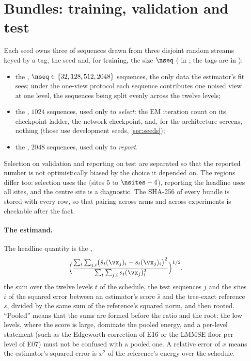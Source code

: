 \section{Bundles: training, validation and test}
\label{sec:bundles}

Each seed owns three  of sequences drawn from three disjoint random
streams keyed by a tag, the seed and, for training, the size $\nseq$
( in ; the tags are in
):
\begin{itemize}
\item the , $\nseq\in\{32,128,512,2048\}$ sequences, the only
  data the estimator's fit sees; under the one-view protocol each sequence
  contributes one noised view at one level, the sequences being split evenly across
  the twelve levels;
\item the , $1024$ sequences, used only to \emph{select}: the
  EM iteration count on its checkpoint ladder, the network checkpoint, and, for the
  architecture screens, nothing (those use development seeds, \cref{sec:seeds});
\item the , $2048$ sequences, used only to \emph{report}.
\end{itemize}
Selection on validation and reporting on test are separated so that the reported
number is not optimistically biased by the choice it depended on. The regions differ
too: selection uses the  (sites $5$ to $\nsites-4$), reporting the headline
uses all sites, and the centre site is a diagnostic. The SHA-256 of every bundle is
stored with every row, so that pairing across arms and across experiments is
checkable after the fact.

\paragraph{The estimand.}
The headline quantity is the ,
\begin{equation}
  \Bigl(\frac{\sum_t\sum_{j,i}\bigl(\hat s_t(\vx_j)_i-s_t(\vx_j)_i\bigr)^2}{\sum_t\sum_{j,i}s_t(\vx_j)_i^2}\Bigr)^{1/2},
  \label{eq:estimand}
\end{equation}
the sum over the twelve levels $t$ of the schedule, the test sequences $j$ and the
sites $i$ of the squared error between an estimator's score $\hat s$ and the tree-exact
reference $s$, divided by the same sum of the reference's squared norm, and then
rooted. ``Pooled'' means that the sums are formed before the ratio and the root: the
low levels, where the score is large, dominate the pooled energy, and a per-level
statement (such as the Edgeworth correction of E16 or the LMMSE floor per level of
E07) must not be confused with a pooled one. A relative error of $x$ means the
estimator's squared error is $x^2$ of the reference's energy over the schedule.

